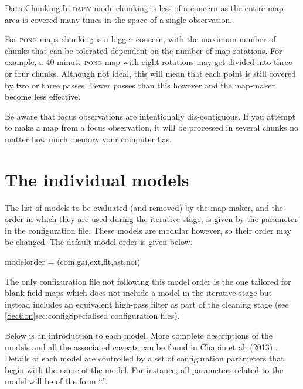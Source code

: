 \begin{sltextbox}{Data Chunking}
  In \textsc{daisy} mode chunking is less of a concern as the entire
  map area is covered many times in the space of a single observation.

  For \textsc{pong} maps chunking is a bigger concern, with the
  maximum number of chunks that can be tolerated dependent on the
  number of map rotations. For example, a 40-minute \textsc{pong} map
  with eight rotations may get divided into three or four
  chunks. Although not ideal, this will mean that each point is still
  covered by two or three passes. Fewer passes than this however and
  the map-maker become less effective.

  Be aware that focus observations are intentionally dis-contiguous. If
  you attempt to make a map from a focus observation, it will be
  processed in several chunks no matter how much memory your computer has.
\end{sltextbox}

\section{The individual models}
\label{sec:models}

The list of models to be evaluated (and removed) by the map-maker, and
the order in which they are used during the iterative stage, is given by
the  parameter in the configuration file.
These models are modular however, so their order may be changed. The
default model order is given below.

\begin{terminalv}
modelorder = (com,gai,ext,flt,ast,noi)
\end{terminalv}

The only configuration file not following this model order is the one tailored
for blank field maps which does not include a  model in the
iterative stage but instead includes an equivalent high-pass filter
as part of the cleaning stage (see \cref{Section}{sec:config}{Specialised
configuration files}).

Below is an introduction to each model. More complete descriptions of the
models and all the associated caveats can be found in Chapin et al.
(2013) \cite{mapmaker}. Details of each model are controlled by a set of
configuration parameters that begin with the name of the model. For
instance, all parameters related to the  model will be of the
form ``''.


